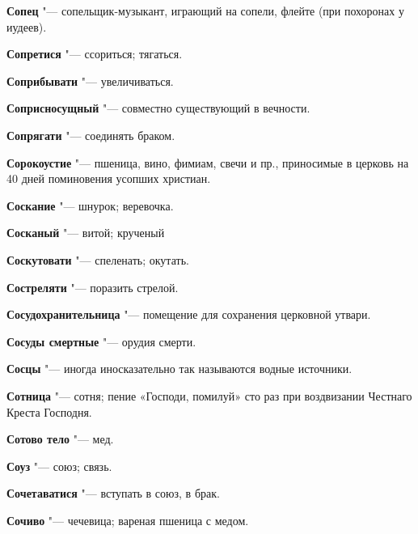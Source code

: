 \begin{mymulticols}{2}
\noindent\textbf{Сопец} "--- сопельщик-музыкант, играющий на сопели, флейте (при похоронах у иудеев). 




\noindent\textbf{Сопретися} "--- ссориться; тягаться. 




\noindent\textbf{Соприбывати} "--- увеличиваться. 




\noindent\textbf{Соприсносущный} "--- совместно существующий в вечности. 




\noindent\textbf{Сопрягати} "--- соединять браком. 




\noindent\textbf{Сорокоустие} "--- пшеница, вино, фимиам, свечи и пр., приносимые в церковь на 40 дней поминовения усопших христиан. 




\noindent\textbf{Соскание} "--- шнурок; веревочка. 




\noindent\textbf{Сосканый} "--- витой; крученый 




\noindent\textbf{Соскутовати} "--- спеленать; окутать. 




\noindent\textbf{Состреляти} "--- поразить стрелой. 




\noindent\textbf{Сосудохранительница} "--- помещение для сохранения церковной утвари. 




\noindent\textbf{Сосуды смертные} "--- орудия смерти. 




\noindent\textbf{Сосцы} "--- иногда иносказательно так называются водные источники. 




\noindent\textbf{Сотница} "--- сотня; пение «Господи, помилуй» сто раз при воздвизании Честнаго Креста Господня. 




\noindent\textbf{Сотово тело} "--- мед. 




\noindent\textbf{Соуз} "--- союз; связь. 




\noindent\textbf{Сочетаватися} "--- вступать в союз, в брак. 




\noindent\textbf{Сочиво} "--- чечевица; вареная пшеница с медом. 





\end{mymulticols}
